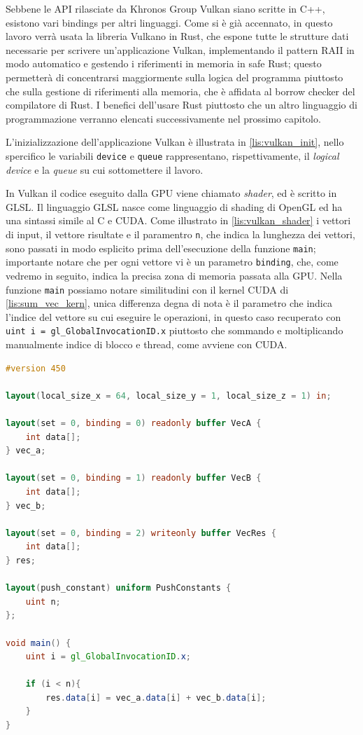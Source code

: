 Sebbene le API rilasciate da Khronos Group Vulkan  siano scritte in C++, esistono vari bindings per altri linguaggi. Come si è già accennato, in questo lavoro verrà usata la libreria Vulkano \cite[]{github:Vulkano} in Rust, che espone tutte le strutture dati necessarie per scrivere un'applicazione Vulkan, implementando il pattern RAII in modo automatico e gestendo i riferimenti in memoria in safe Rust; questo permetterà di concentrarsi maggiormente sulla logica del programma piuttosto che sulla gestione di riferimenti alla memoria, che è affidata al borrow checker \cite[]{Rust:borrow_checker} del compilatore di Rust. I benefici dell'usare Rust piuttosto che un altro linguaggio di programmazione verranno elencati successivamente nel prossimo capitolo.

 

L'inizializzazione dell'applicazione Vulkan è illustrata in \ref{lis:vulkan_init}, nello spercifico le variabili \verb|device| e \verb|queue| rappresentano, rispettivamente, il \textit{logical device} e la \textit{queue} su cui sottomettere il lavoro. 

In Vulkan il codice eseguito dalla GPU viene chiamato \textit{shader}, ed è scritto in GLSL. Il linguaggio GLSL nasce come linguaggio di shading di OpenGL ed ha una sintassi simile al C e CUDA. Come illustrato in \ref{lis:vulkan_shader} i vettori di input, il vettore risultate e il paramentro \verb|n|, che indica la lunghezza dei vettori, sono passati in modo esplicito prima dell'esecuzione della funzione \verb|main|; importante notare che per ogni vettore vi è un parametro \verb|binding|, che, come vedremo in seguito, indica la precisa zona di memoria passata alla GPU.  Nella funzione \verb|main| possiamo notare similitudini con il kernel CUDA di \ref{lis:sum_vec_kern}, unica differenza degna di nota è il parametro che indica l'indice del vettore su cui eseguire le operazioni, in questo caso recuperato con \verb|uint i = gl_GlobalInvocationID.x| piuttosto che sommando e moltiplicando manualmente indice di blocco e thread, come avviene con CUDA.

\begin{lstlisting}[language=GLSL, caption=Shader GLSL di somma di vettori, label=lis:vulkan_shader]
#version 450

layout(local_size_x = 64, local_size_y = 1, local_size_z = 1) in;

layout(set = 0, binding = 0) readonly buffer VecA {
    int data[];
} vec_a;

layout(set = 0, binding = 1) readonly buffer VecB {
    int data[];
} vec_b;

layout(set = 0, binding = 2) writeonly buffer VecRes {
    int data[];
} res;

layout(push_constant) uniform PushConstants {
    uint n;
};

void main() {
    uint i = gl_GlobalInvocationID.x;

    if (i < n){
        res.data[i] = vec_a.data[i] + vec_b.data[i];
    }
}    
\end{lstlisting}
    
